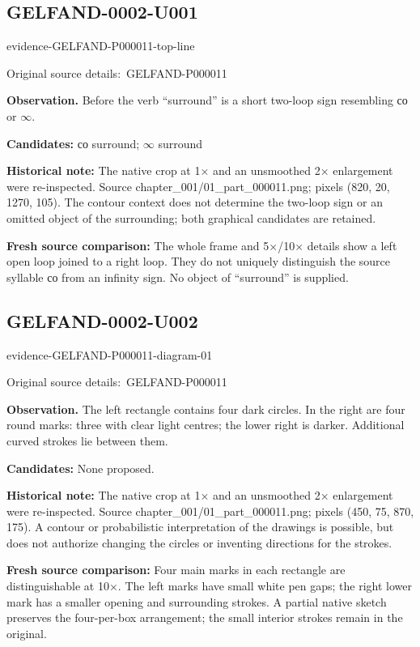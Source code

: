 \documentclass[11pt]{article}
\newcommand{\EvidenceBlock}[4]{%
 \par\smallskip\noindent\begin{minipage}{\linewidth}
 \begin{minipage}[t]{.47\linewidth}\vspace{0pt}\centering
 \csname evidence-#1-#2\endcsname\par
 {\scriptsize\SourceCropCaption\ #1}\par
 \end{minipage}\hfill
 \begin{minipage}[t]{.49\linewidth}\vspace{0pt}\raggedright
 {\small\color{orange!65!black}\textbf{#4} #3}\par
 \end{minipage}
 \end{minipage}\par\smallskip}
\newcommand{\SourceCropCaption}{Original source details:}\newcommand{\ReadingCaption}{Uncertain reading.}\newcommand{\IncompleteCaption}{Undeciphered passage.}\newcommand{\DiagramCaption}{Diagram and typed description.}
\begin{document}
\subsection*{GELFAND-0002-U001}
\EvidenceBlock{GELFAND-P000011}{top-line}{Before the verb “surround” is a short two-loop sign resembling со or \(\infty\).}{Observation.}
\par\smallskip\noindent\textbf{Candidates: } со surround; \(\infty\) surround\par
\par\smallskip\noindent\textbf{Historical note: } The native crop at 1× and an unsmoothed 2× enlargement were re-inspected. Source chapter\_001/01\_part\_000011.png; pixels (820, 20, 1270, 105). The contour context does not determine the two-loop sign or an omitted object of the surrounding; both graphical candidates are retained.\par
\par\smallskip\noindent\textbf{Fresh source comparison: } The whole frame and 5×/10× details show a left open loop joined to a right loop. They do not uniquely distinguish the source syllable со from an infinity sign. No object of “surround” is supplied.\par

\subsection*{GELFAND-0002-U002}
\EvidenceBlock{GELFAND-P000011}{diagram-01}{The left rectangle contains four dark circles. In the right are four round marks: three with clear light centres; the lower right is darker. Additional curved strokes lie between them.}{Observation.}
\par\smallskip\noindent\textbf{Candidates: } None proposed.\par
\par\smallskip\noindent\textbf{Historical note: } The native crop at 1× and an unsmoothed 2× enlargement were re-inspected. Source chapter\_001/01\_part\_000011.png; pixels (450, 75, 870, 175). A contour or probabilistic interpretation of the drawings is possible, but does not authorize changing the circles or inventing directions for the strokes.\par
\par\smallskip\noindent\textbf{Fresh source comparison: } Four main marks in each rectangle are distinguishable at 10×. The left marks have small white pen gaps; the right lower mark has a smaller opening and surrounding strokes. A partial native sketch preserves the four-per-box arrangement; the small interior strokes remain in the original.\par
\end{document}
